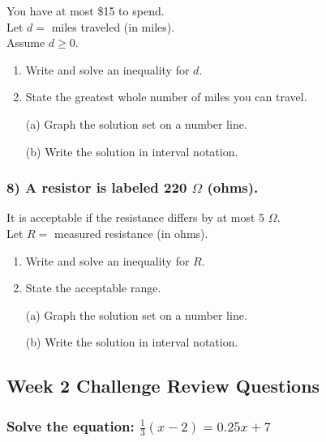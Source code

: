 \documentclass[12pt]{article}
\begin{document}
                You have at most \$15 to spend.\\
                Let $d =$ miles traveled (in miles).\\
                Assume $d \geq 0$.
                
                \begin{enumerate}
                    \item Write and solve an inequality for $d$.
                    \item State the greatest whole number of miles you can travel.
                    \item[(a)] Graph the solution set on a number line.
                    \item[(b)] Write the solution in interval notation.
                \end{enumerate}
                
                \vspace{0.5cm}

            \subsubsection*{8) A resistor is labeled 220 $\Omega$ (ohms).}
            
                It is acceptable if the resistance differs by at most 5 $\Omega$.\\
                Let $R =$ measured resistance (in ohms).
                
                \begin{enumerate}
                    \item Write and solve an inequality for $R$.
                    \item State the acceptable range.
                    \item[(a)] Graph the solution set on a number line.
                    \item[(b)] Write the solution in interval notation.
                \end{enumerate}

                \newpage

        \subsection*{Week 2 Challenge Review Questions}

            \subsubsection*{Solve the equation: $\frac{1}{3}(x - 2) = 0.25x + 7$}
            
\end{document}
